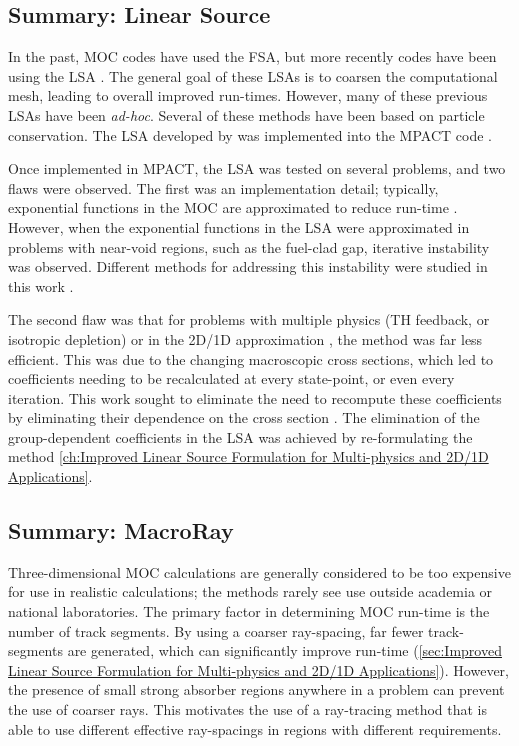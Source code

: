 {{    \subsection{Summary: Linear Source}{\label{ssec:Summary:Linear Source}
      In the past, \acf{MOC} codes have used the \acf{FSA}, but more recently codes have been using the \acf{LSA} \cite{Halsall1993,Petkov1999,Santandrea2002,Tang2009,Rabiti2009,Hebert2016,Ferrer2016,Gunow2018}.
      The general goal of these \acp{LSA} is to coarsen the computational mesh, leading to overall improved run-times.
      However, many of these previous \acp{LSA} have been \emph{ad-hoc}.
      Several of these methods \cite{Santandrea2002,Hebert2016,Ferrer2016} have been based on particle conservation.
      The \ac{LSA} developed by \citet{Ferrer2016} was implemented into the MPACT code \cite{Fitzgerald2018,Fitzgerald2019}.

      Once implemented in MPACT, the \ac{LSA} was tested on several problems, and two flaws were observed.
      The first was an implementation detail; typically, exponential functions in the \ac{MOC} are approximated to reduce run-time \cite{Yamamoto2004}.
      However, when the exponential functions in the \ac{LSA} were approximated in problems with near-void regions, such as the fuel-clad gap, iterative instability was observed.
      Different methods for addressing this instability were studied in this work \cite{Fitzgerald2018}.

      The second flaw was that for problems with multiple physics (\acf{TH} feedback, or isotropic depletion) or in the 2D/1D approximation \cite{Collins2016}, the method was far less efficient.
      This was due to the changing macroscopic cross sections, which led to coefficients needing to be recalculated at every state-point, or even every iteration.
      This work sought to eliminate the need to recompute these coefficients by eliminating their dependence on the cross section \cite{Fitzgerald2019}.
      The elimination of the group-dependent coefficients in the \ac{LSA} was achieved by re-formulating the method \cref{ch:Improved Linear Source Formulation for Multi-physics and 2D/1D Applications}.
    }

    \subsection{Summary: MacroRay}{\label{ssec:Summary:MacroRay}
      Three-dimensional \ac{MOC} calculations are generally considered to be too expensive for use in realistic calculations; the methods rarely see use outside academia or national laboratories.
      The primary factor in determining \ac{MOC} run-time is the number of track segments.
      By using a coarser ray-spacing, far fewer track-segments are generated, which can significantly improve run-time (\cref{sec:Improved Linear Source Formulation for Multi-physics and 2D/1D Applications}).
      However, the presence of small strong absorber regions anywhere in a problem can prevent the use of coarser rays.
      This motivates the use of a ray-tracing method that is able to use different effective ray-spacings in regions with different requirements.

}}}
